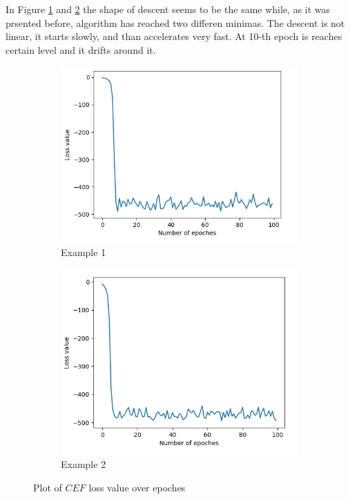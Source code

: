 \documentclass[11pt,a4paper]{IEEEtran}
\begin{document}
In Figure \ref{fig:loss2:1} and \ref{fig:loss2:2} the shape of descent seems to be the same while, as it was prsented before,  algorithm has reached two differen minimas. The descent is not linear, it starts slowly, and than accelerates very fast. At 10-th epoch is reaches certain level and it drifts around it. 

\begin{figure}[!hbt]	
	\begin{subfigure}[b]{0.43\textwidth}
		\includegraphics[width=\textwidth]{examples/3/loss.png}
		\caption{Example 1}
		\label{fig:loss2:1}
	\end{subfigure}
	\begin{subfigure}[b]{0.43\textwidth}
		\includegraphics[width=\textwidth]{examples/4/loss.png}
		\caption{Example 2}
		\label{fig:loss2:2}
	\end{subfigure}
	\caption{Plot of $CEF$ loss value over epoches}
	\label{fig:loss2}
\end{figure}
\end{document}
